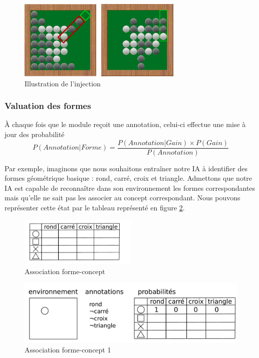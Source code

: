 \begin{figure}[H] 
\begin{center}
\includegraphics[width=0.7\textwidth]{files/raisonneur/cbs_reco3} 
\end{center}
\caption{Illustration de l'injection} 
\label{img_cbs_reco3}
\end{figure}

\subsubsection{Valuation des formes}

À chaque fois que le module reçoit une annotation, celui-ci effectue une mise à jour des probabilité
\[ P(Annotation|Forme) = \frac{P(Annotation|Gain) \times P(Gain)}{P(Annotation)} \]

Par exemple, imaginons que nous souhaitons entraîner notre IA à identifier des formes géométrique basique : rond, carré, croix et triangle. Admettons que notre IA est capable de reconnaître dans son environnement les formes correspondantes mais qu'elle ne sait pas les associer au concept correspondant. Nous pouvons représenter cette état par le tableau représenté en figure \ref{img_annotations}.

\begin{figure}[H] 
  \begin{center}
    \includegraphics[width=0.5\textwidth]{files/raisonneur/annotations} 
  \end{center}
\caption{Association forme-concept} 
\label{img_annotations}
\end{figure}

\begin{figure}[H] 
\includegraphics[width=\textwidth]{files/raisonneur/annotations_1} 
\caption{Association forme-concept 1} 
\label{img_annotations_1}
\end{figure}

